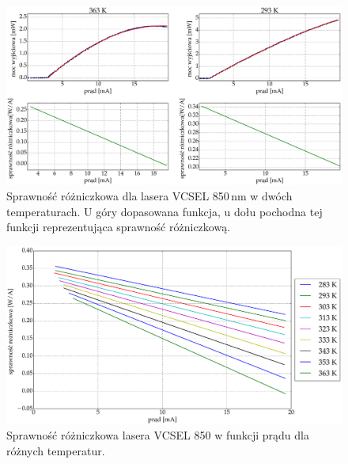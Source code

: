 \begin{figure}
\center
  \includegraphics[scale=0.30]{plot_vcsel_850/plot_eff_all_via_current2.eps}
  \caption{Sprawność różniczkowa dla lasera VCSEL 850\,nm w dwóch temperaturach. U góry dopasowana funkcja,
u dołu pochodna tej funkcji reprezentująca sprawność różniczkową.}
  \label{fig:plot_eff_all_via_current2_vcsel850}
\end{figure}
\begin{figure}
\center
  \includegraphics[scale=0.25]{plot_vcsel_850/plot_eff_all_via_current.eps}
  \caption{Sprawność różniczkowa lasera VCSEL 850 w funkcji prądu dla różnych temperatur.}
  \label{fig:plot_eff_all_via_current_vcsel850}
\end{figure}
